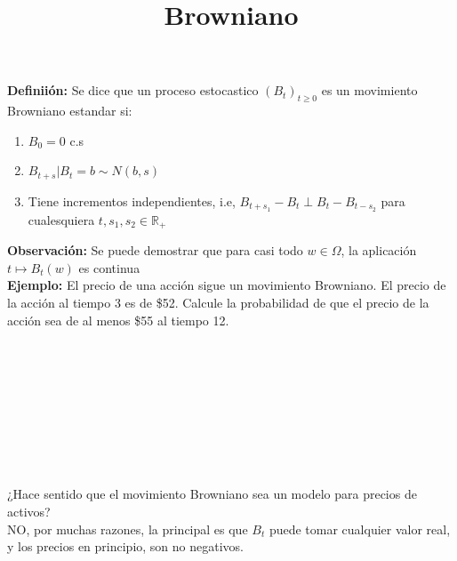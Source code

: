 \documentclass[12pts]{extarticle}
\author{}
\date{}
\title{Browniano}
\begin{document}
 
\maketitle
\textbf{Definiión:} Se dice que un proceso estocastico $(B_t)_{t\geq0}$ es un movimiento Browniano estandar si:
\begin{enumerate}
\item $B_0 =0$ c.s
\item $B_{t+s}|B_t =b \sim N(b,s)$
\item Tiene incrementos independientes, i.e, $B_{t+s_{1}} -B_t \perp B_t-B_{t-{s_2}}$ para cualesquiera $t, s_1, s_2 \in \mathbb{R}_+$
\end{enumerate}

\textbf{Observación:} Se puede demostrar que para casi todo $w \in \Omega$, la aplicación $t \mapsto B_t (w)$ es continua
\\ 
\textbf{Ejemplo:} El precio de una acción sigue un movimiento Browniano. El precio de la acción al tiempo 3 es de \$52. Calcule la probabilidad de que el precio de la acción sea de al menos \$55 al tiempo 12. 
\\ \\ \\ \\ \\ \\ \\ \\ \\ \\ 
¿Hace sentido que el movimiento Browniano sea un modelo para precios de activos? \\ NO, por muchas razones, la principal es que $B_t$ puede tomar cualquier valor real, y los precios en principio, son no negativos. 
\end{document}
